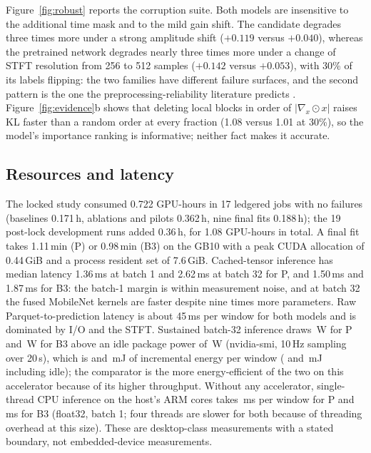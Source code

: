 \documentclass[sigconf,anonymous]{acmart}
\begin{document}
Figure~\ref{fig:robust} reports the corruption suite. Both models are insensitive to the additional time mask and to the mild gain shift. The candidate degrades three times more under a strong amplitude shift ($+0.119$ versus $+0.040$), whereas the pretrained network degrades nearly three times more under a change of STFT resolution from 256 to 512 samples ($+0.142$ versus $+0.053$), with 30\% of its labels flipping: the two families have different failure surfaces, and the second pattern is the one the preprocessing-reliability literature predicts \cite{hou2026samebrain}. Figure~\ref{fig:evidence}b shows that deleting local blocks in order of $|\nabla_x\odot x|$ raises KL faster than a random order at every fraction (1.08 versus 1.01 at 30\%), so the model's importance ranking is informative; neither fact makes it accurate.

\subsection{Resources and latency}
The locked study consumed 0.722 GPU-hours in 17 ledgered jobs with no failures (baselines 0.171\,h, ablations and pilots 0.362\,h, nine final fits 0.188\,h); the 19 post-lock development runs added 0.36\,h, for 1.08 GPU-hours in total. A final fit takes 1.11\,min (P) or 0.98\,min (B3) on the GB10 with a peak CUDA allocation of 0.44\,GiB and a process resident set of 7.6\,GiB. Cached-tensor inference has median latency 1.36\,ms at batch 1 and 2.62\,ms at batch 32 for P, and 1.50\,ms and 1.87\,ms for B3\paretoref: the batch-1 margin is within measurement noise, and at batch 32 the fused MobileNet kernels are faster despite nine times more parameters. Raw Parquet-to-prediction latency is about 45\,ms per window for both models and is dominated by I/O and the STFT. Sustained batch-32 inference draws \loadwP{}\,W for P and \loadwBthree{}\,W for B3 above an idle package power of \idlew{}\,W (nvidia-smi, 10\,Hz sampling over 20\,s), which is \ewinP{} and \ewinBthree{}\,mJ of incremental energy per window (\ewintotP{} and \ewintotBthree{}\,mJ including idle); the comparator is the more energy-efficient of the two on this accelerator because of its higher throughput. Without any accelerator, single-thread CPU inference on the host's ARM cores takes \cpuoneP{}\,ms per window for P and \cpuoneBthree{}\,ms for B3 (float32, batch 1; four threads are slower for both because of threading overhead at this size). These are desktop-class measurements with a stated boundary, not embedded-device measurements.
\end{document}
